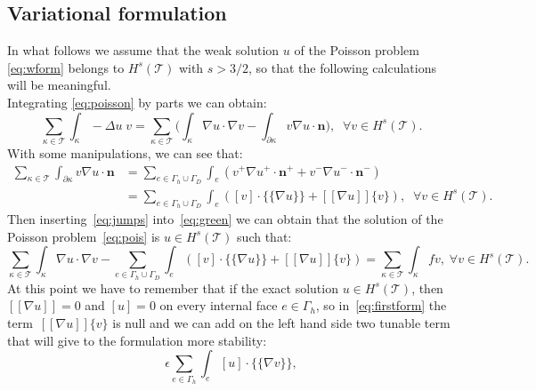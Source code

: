 \documentclass[12pt, a4paper]{article}
\begin{document}
\subsection{Variational formulation}
In what follows we assume that the weak solution $u$ of the Poisson problem~ \eqref{eq:wform} belongs to $H^s(\mathcal{T})$ with $s > 3/2$, so that the following calculations will be meaningful.\\
Integrating \eqref{eq:poisson} by parts we can obtain:
\begin{equation} \label{eq:green}
	\sum_{\kappa \in \mathcal{T}} \int_\kappa -\Delta u \; v
	= \sum_{\kappa \in \mathcal{T}} \bigg( \int_\kappa \nabla u \cdot \nabla v
	- \int_{\partial \kappa} v \nabla u \cdot \mathbf{n} \bigg), \;\; \forall v \in H^s(\mathcal{T}).
\end{equation}
With some manipulations, we can see that:
\begin{equation} \label{eq:jumps}
\begin{split}
	\sum_{\kappa \in \mathcal{T}} \int_{\partial \kappa} v \nabla u \cdot \mathbf{n} &= \sum_{e \in \Gamma_h \cup \Gamma_D} \int_e (v^+ \nabla u^+ \cdot \mathbf{n}^+ + v^- \nabla u^- \cdot \mathbf{n}^- )\\
	&= \sum_{e \in \Gamma_h \cup \Gamma_D} \int_e ([v] \cdot \{\!\!\{ \nabla u \}\!\!\} + [\![ \nabla u ]\!] \{v\} ), \;\; \forall v \in H^s(\mathcal{T}).
\end{split}
\end{equation}
Then inserting~\eqref{eq:jumps} into~\eqref{eq:green} we can obtain that the solution of the Poisson problem~\eqref{eq:pois} is $u \in H^s(\mathcal{T})$ such that:
\begin{equation} \label{eq:firstform}
	\sum_{\kappa \in \mathcal{T}} \int_\kappa \nabla u \cdot \nabla v -
	\sum_{e \in \Gamma_h \cup \Gamma_D} \int_e ([v] \cdot \{\!\!\{ \nabla u \}\!\!\} + [\![ \nabla u ]\!] \{v\} ) =
	\sum_{\kappa \in \mathcal{T}} \int_\kappa fv, \; \forall v \in H^s(\mathcal{T}).
\end{equation}
At this point we have to remember that if the exact solution $u \in H^s(\mathcal{T})$, then $[\![\nabla u]\!] = 0$ and $[u] = 0$ on every internal face $e \in \Gamma_h$, so in~\eqref{eq:firstform} the term~$[\![ \nabla u ]\!] \{v\}$ is null and we can add on the left hand side two tunable term that will give to the formulation more stability:
\begin{equation*}
	\epsilon \sum_{e \in \Gamma_h} \int_e [u] \cdot \{\!\!\{ \nabla v \}\!\!\},
\end{equation*}
\end{document}
